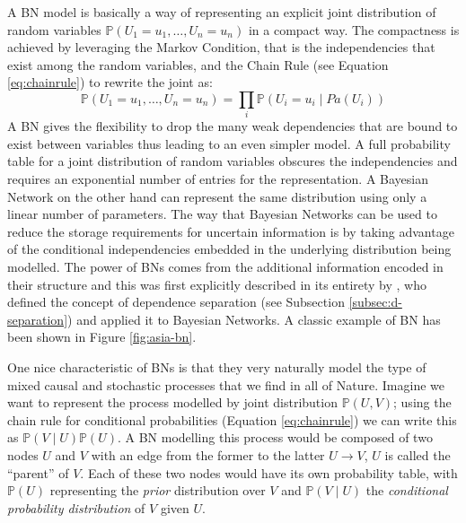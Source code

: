 A BN model is basically a way of representing an explicit joint distribution of random variables $\mathbb{P}(U_1=u_1, \ldots ,U_n=u_n) $ in a compact way.
The compactness is achieved by leveraging the Markov Condition, that is the independencies that exist among the random variables, and the Chain Rule (see Equation \ref{eq:chainrule}) to rewrite the joint as:
\begin{equation}
	\mathbb{P}(U_1=u_1, \ldots ,U_n=u_n) = \prod_i \mathbb{P}(U_i=u_i \mid Pa(U_i))
\end{equation} 
A BN gives the flexibility to drop the many weak dependencies that are bound to exist between variables thus leading to an even simpler model.
A full probability table for a joint distribution of random variables obscures the independencies and requires an exponential number of entries for the representation.
A Bayesian Network on the other hand can represent the same distribution using only a linear number of parameters.
The way that Bayesian Networks can be used to reduce the storage requirements for uncertain information is by taking advantage of the conditional independencies embedded in the underlying distribution being modelled.
The power of BNs comes from the additional information encoded in their structure and this was first explicitly described in its entirety by \citet{Pearl1988}, who defined the concept of dependence separation (see Subsection \ref{subsec:d-separation}) and applied it to Bayesian Networks.
A classic example of BN has been shown in Figure \ref{fig:asia-bn}.

One nice characteristic of BNs is that they very naturally model the type of mixed causal and stochastic processes that we find in all of Nature.
Imagine we want to represent the process modelled by joint distribution $\mathbb{P}(U,V)$; using the chain rule for conditional probabilities (Equation \ref{eq:chainrule}) we can write this as $\mathbb{P}(V \mid U) \mathbb{P}(U)$.
A BN modelling this process would be composed of two nodes $U$ and $V$ with an edge from the former to the latter $U \rightarrow V$, $U$ is called the \enquote{parent} of $V$.  Each of these two nodes would have its own probability table, with $\mathbb{P}(U)$ representing the \textit{prior} distribution over $V$ and $\mathbb{P}(V \mid U)$ the \textit{conditional probability distribution} of $V$ given $U$.

